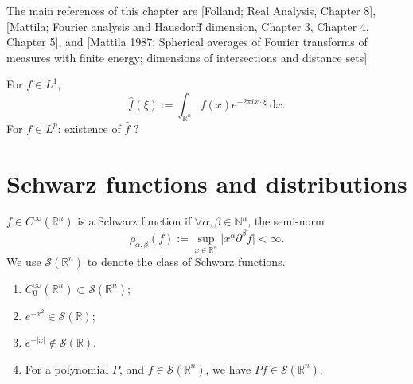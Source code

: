 \theoremstyle{definition}

The main references of this chapter are [Folland; Real Analysis, Chapter 8], [Mattila;
Fourier analysis and Hausdorff dimension, Chapter 3, Chapter 4, Chapter 5],
and [Mattila 1987; Spherical averages of Fourier transforms of measures with
finite energy; dimensions of intersections and distance sets]

For $f \in L^{1}$, 
$$
\hat{f}(\xi):=\int _{\mathbb{R}^{n}}f(x)e^{-2\pi ix\cdot \xi}\ \mathrm{d}x.
$$
For $f \in L^{p}$: existence of $\hat{f}$ ?

\section{Schwarz functions and distributions}

\begin{definition}\label{def:schwarz}
$f\in C^{\infty}(\mathbb{R}^{n})$ is a Schwarz function if $\forall \alpha,\beta \in \mathbb{N}^{n}$, the semi-norm
$$
\rho _{\alpha,\beta}(f):=\sup_{x \in \mathbb{R}^{n}}\lvert x^{\alpha}\partial ^{\beta}f \rvert<\infty.
$$
We use $\mathscr{S}(\mathbb{R}^{n})$ to denote the class of Schwarz functions.
\end{definition}

\begin{example}\label{ex:schwarz_examples}
\begin{enumerate}[label=(\roman*)]
    \item $C_{0}^{\infty}(\mathbb{R}^{n})\subset \mathscr{S}(\mathbb{R}^{n})$;
    \item $e^{-x^{2}} \in \mathscr{S}(\mathbb{R})$;
    \item $e^{-\lvert x \rvert}\notin \mathscr{S}(\mathbb{R})$.
    \item For a polynomial $P$, and $f \in \mathscr{S}(\mathbb{R}^{n})$, we have $Pf\in \mathscr{S}(\mathbb{R}^{n})$.
\end{enumerate}
\end{example}

